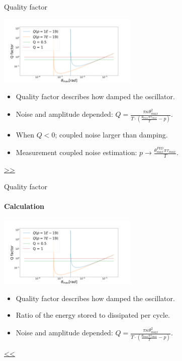 \documentclass{beamer}
\begin{document}
\begin{frame}{\hypertarget{frame:Quality factor}{Quality factor}}
	\begin{center}		
		\includegraphics[width=0.5\textwidth,keepaspectratio]{Q factor.png}
	\end{center}
	\begin{itemize}	
		\item Quality factor describes how damped the oscillator.
		\item Noise and amplitude depended: $Q =  \frac{\pi\kappa\theta_{max}^2}{T\cdot(\frac{\theta_{max}\pi\tau_{max}}{T} -p)} $.
		\item When $Q<0$; coupled noise larger than damping.
		\item Measurement coupled noise estimation: $p \rightarrow \frac{ \theta_{max}^{PID}\pi\tau_{max}}{T}$. 				
	\end{itemize}
	\hyperlink{frame:Quality factor 1}{>>} 
\end{frame}

\begin{frame}{\hypertarget{frame:Quality factor 1}{Quality factor}}
	\framesubtitle{Calculation}
	\begin{center}		
		\includegraphics[width=0.5\textwidth,keepaspectratio]{Q factor.png}
	\end{center}
	\begin{itemize}	
		\item Quality factor describes how damped the oscillator.
		\item Ratio of the energy stored to dissipated per cycle.
		\item Noise and amplitude depended: $Q =  \frac{\pi\kappa\theta_{max}^2}{T\cdot(\frac{\theta_{max}\pi\tau_{max}}{T} -p)} $.
					
	\end{itemize}
	\hyperlink{frame:Quality factor}{<<} 

\end{frame}
\end{document}
